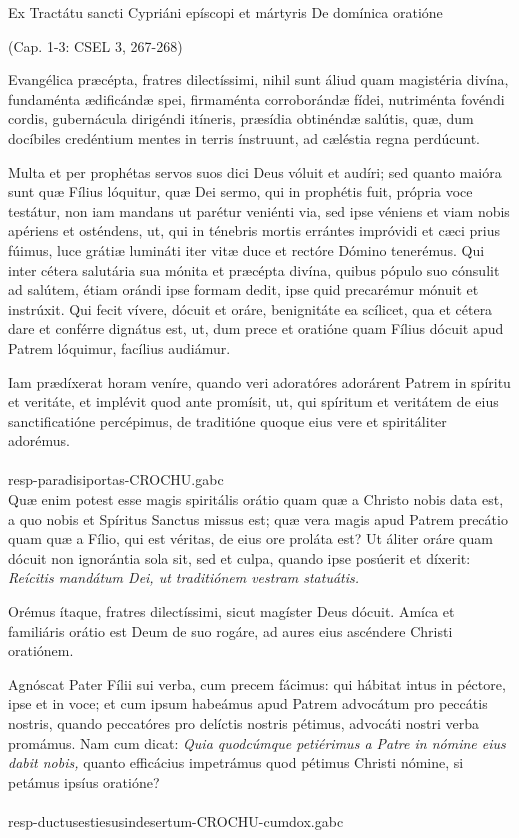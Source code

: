 \documentclass[options]{article}
\begin{document}
	Ex Tractátu sancti Cypriáni epíscopi et mártyris De domínica oratióne 
	\begin{flushright}
	(Cap. 1-3: CSEL 3, 267-268)	
	\end{flushright}
	
	Evangélica præcépta, fratres dilectíssimi, nihil sunt áliud quam magistéria divína, fundaménta ædificándæ spei, firmaménta corroborándæ fídei, nutriménta fovéndi cordis, gubernácula dirigéndi itíneris, præsídia obtinéndæ salútis, quæ, dum docíbiles credéntium mentes in terris ínstruunt, ad cæléstia regna perdúcunt.
	
	Multa et per prophétas servos suos dici Deus vóluit et audíri; sed quanto maióra sunt quæ Fílius lóquitur, quæ Dei sermo, qui in prophétis fuit, própria voce testátur, non iam mandans ut parétur veniénti via, sed ipse véniens et viam nobis apériens et osténdens, ut, qui in ténebris mortis errántes impróvidi et cæci prius fúimus, luce grátiæ lumináti iter vitæ duce et rectóre Dómino tenerémus.
	Qui inter cétera salutária sua mónita et præcépta divína, quibus pópulo suo cónsulit ad salútem, étiam orándi ipse formam dedit, ipse quid precarémur mónuit et instrúxit. Qui fecit vívere, dócuit et oráre, benignitáte ea scílicet, qua et cétera dare et conférre dignátus est, ut, dum prece et oratióne quam Fílius dócuit apud Patrem lóquimur, facílius audiámur.
	
	Iam prædíxerat horam veníre, quando veri adoratóres adorárent Patrem in spíritu et veritáte, et implévit quod ante promísit, ut, qui spíritum et veritátem de eius sanctificatióne percépimus, de traditióne quoque eius vere et spiritáliter adorémus.\\
	\\
	resp-paradisiportas-CROCHU.gabc
	\\
	Quæ enim potest esse magis spiritális orátio quam quæ a Christo nobis data est, a quo nobis et Spíritus Sanctus missus est; quæ vera magis apud Patrem precátio quam quæ a Fílio, qui est véritas, de eius ore proláta est? Ut áliter oráre quam dócuit non ignorántia sola sit, sed et culpa, quando ipse posúerit et díxerit: \emph{Reícitis mandátum Dei, ut traditiónem vestram statuátis.}
	
	Orémus ítaque, fratres dilectíssimi, sicut magíster Deus dócuit. Amíca et familiáris orátio est Deum de suo rogáre, ad aures eius ascéndere Christi oratiónem.
	
	Agnóscat Pater Fílii sui verba, cum precem fácimus: qui hábitat intus in péctore, ipse et in voce; et cum ipsum habeámus apud Patrem advocátum pro peccátis nostris, quando peccatóres pro delíctis nostris pétimus, advocáti nostri verba promámus. Nam cum dicat: \emph{Quia quodcúmque petiérimus a Patre in nómine eius dabit nobis,} quanto efficácius impetrámus quod pétimus Christi nómine, si petámus ipsíus oratióne?\\
	\\
	resp-ductusestiesusindesertum-CROCHU-cumdox.gabc
\end{document}
